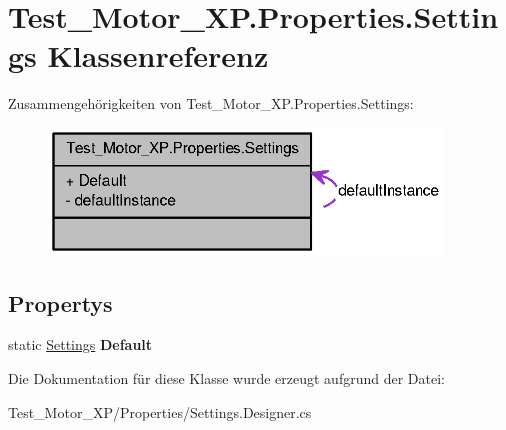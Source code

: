 \hypertarget{class_test___motor___x_p_1_1_properties_1_1_settings}{
\section{Test\_\-Motor\_\-XP.Properties.Settings Klassenreferenz}
\label{class_test___motor___x_p_1_1_properties_1_1_settings}
}


Zusammengehörigkeiten von Test\_\-Motor\_\-XP.Properties.Settings:\nopagebreak
\begin{figure}[H]
\begin{center}
\leavevmode
\includegraphics[width=296pt]{class_test___motor___x_p_1_1_properties_1_1_settings__coll__graph}
\end{center}
\end{figure}
\subsection*{Propertys}
\begin{DoxyCompactItemize}
\item 
\hypertarget{class_test___motor___x_p_1_1_properties_1_1_settings_a73814e6a8d37076545f0172973c8ff33}{
static \hyperlink{class_test___motor___x_p_1_1_properties_1_1_settings}{Settings} {\bfseries Default}}
\label{class_test___motor___x_p_1_1_properties_1_1_settings_a73814e6a8d37076545f0172973c8ff33}

\end{DoxyCompactItemize}


Die Dokumentation für diese Klasse wurde erzeugt aufgrund der Datei:\begin{DoxyCompactItemize}
\item 
Test\_\-Motor\_\-XP/Properties/Settings.Designer.cs\end{DoxyCompactItemize}
